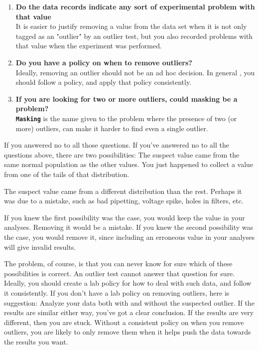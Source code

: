 \begin{enumerate}
\item	 \textbf{Do the data records indicate any sort of experimental problem with that value}\\
It is easier to justify removing a value from the data set when it is not only tagged as an "outlier" by an outlier test, but you also recorded problems with that value when the experiment was performed.

\item 	 \textbf{Do you have a policy on when to remove outliers?}\\
Ideally, removing an outlier should not be an ad hoc decision. In general , you should follow a policy, and apply that policy consistently.

\item \textbf{If you are looking for two or more outliers, could masking be a problem?}\\
\textbf{\texttt{Masking}} is the name given to the problem where the presence of two (or more) outliers, can make it harder to find even a single outlier.

\end{enumerate}

If you answered no to all those questions.
If you've answered no to all the questions above, there are two possibilities:
The suspect value came from the same normal population as the other values. You just happened to collect a value from one of the tails of that distribution.
	
The suspect value came from a different distribution than the rest. Perhaps it was due to a mistake, such as bad pipetting, voltage spike, holes in filters, etc. 

If you knew the first possibility was the case, you would keep the value in your analyses. Removing it would be a mistake.
If you knew the second possibility was the case, you would remove it, since including an erroneous value in your analyses will give invalid results. 

The problem, of course, is that you can never know for sure which of these possibilities is correct. An outlier test cannot answer that question for sure. Ideally, you should create a lab policy for how to deal with such data, and follow it consistently.
If you don't have a lab policy on removing outliers, here is suggestion: Analyze your data both with and without the suspected outlier. If the results are similar either way, you've got a clear conclusion. If the results are very different, then you are stuck. Without a consistent policy on when you remove outliers, you are likely to only remove them when it helps push the data towards the results you want.





